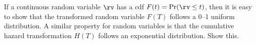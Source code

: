 \begin{exercise1}
\label{exercise:F.of.T.dist}
If a continuous random variable $\rv$ has a cdf $F(t)=\Pr(\rv \leq
t)$, then it is easy to show that the transformed random variable
$F(T)$ follows a 0--1 uniform distribution. A similar property for
random variables is that the cumulative hazard transformation $H(T)$
follows an exponential distribution. Show this.
\end{exercise1}



